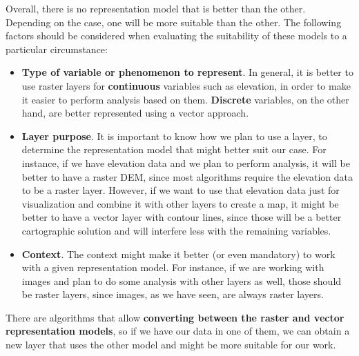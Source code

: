 Overall, there is no representation model that is better than the other. Depending on the case, one will be more suitable than the other. The following factors should be considered when evaluating the suitability of these models to a particular circumstance:

\begin{itemize}
 \item \textbf{Type of variable or phenomenon to represent}. In general, it is better to use raster layers for \textbf{continuous} variables such as elevation, in order to make it easier to perform analysis based on them. \textbf{Discrete} variables, on the other hand, are better represented using a vector approach.
\item \textbf{Layer purpose}. It is important to know how we plan to use a layer, to determine the representation model that might better suit our case. For instance, if we have elevation data and we plan to perform analysis, it will be better to have a raster DEM, since most algorithms require the elevation data to be a raster layer. However, if we want to use that elevation data just for visualization and combine it with other layers to create a map, it might be better to have a vector layer with contour lines, since those will be a better cartographic solution and will interfere less with the remaining variables. 
\item \textbf{Context}. The context might make it better (or even mandatory) to work with a given representation model. For instance, if we are working with images and plan to do some analysis with other layers as well, those should be raster layers, since images, as we have seen, are always raster layers.
\end{itemize}

There are algorithms that allow \textbf{converting between the raster and vector representation models}, so if we have our data in one of them, we can obtain a new layer that uses the other model and might be more suitable for our work.

\pagestyle{empty}
